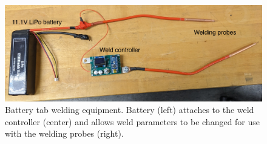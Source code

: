 \documentclass{article}
\begin{document}
\begin{figure}[h!]
\centering
\includegraphics[width=\textwidth]{images/welder}
\caption{Battery tab welding equipment. Battery (left) attaches to the weld controller (center) and allows weld parameters to be changed for use with the welding probes (right).}
\label{fig:welder}
\end{figure}
\end{document}
